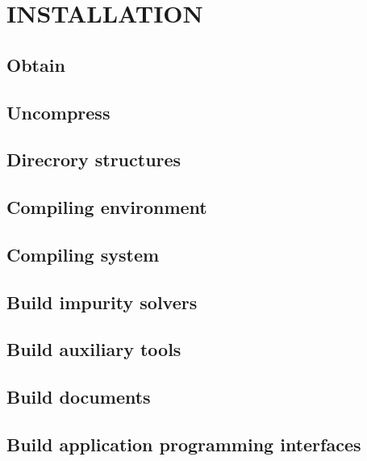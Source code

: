 \chapter{INSTALLATION}
\section{Obtain}
\section{Uncompress}
\section{Direcrory structures}
\section{Compiling environment}
\section{Compiling system}
\section{Build impurity solvers}
\section{Build auxiliary tools}
\section{Build documents}
\section{Build application programming interfaces}
